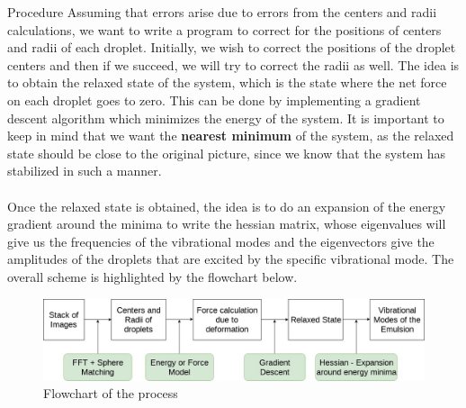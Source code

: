 \documentclass[12pt]{article}
\begin{document}
\begin{section}{Procedure}
Assuming that errors arise due to errors from the centers and radii calculations, we want to write a program to correct for the positions of centers and radii of each droplet. Initially, we wish to correct the positions of the droplet centers and then if we succeed, we will try to correct the radii as well. The idea is to obtain the relaxed state of the system, which is the state where the net force on each droplet goes to zero. This can be done by implementing a gradient descent algorithm which minimizes the energy of the system. It is important to keep in mind that we want the \textbf{nearest minimum} of the system, as the relaxed state should be close to the original picture, since we know that the system has stabilized in such a manner. \\\\
Once the relaxed state is obtained, the idea is to do an expansion of the energy gradient around the minima to write the hessian matrix\cite{schindler2016range}, whose eigenvalues will give us the frequencies of the vibrational modes and the eigenvectors give the amplitudes of the droplets that are excited by the specific vibrational mode. The overall scheme is highlighted by the flowchart below. 
\begin{figure}[h!]
    \centering
    \includegraphics[width = 0.95\linewidth]{images/scheme.jpg}
    \caption{Flowchart of the process}
    \label{fig:my_label}
\end{figure}
\end{section}
\end{document}
